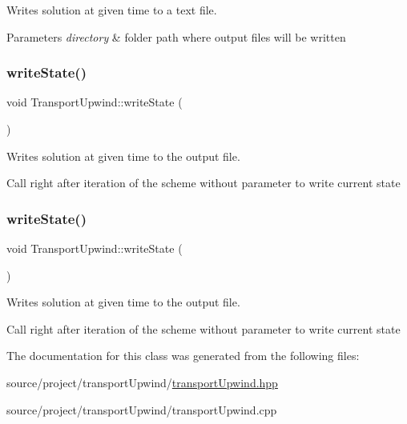 Writes solution at given time to a text file. 


\begin{DoxyParams}{Parameters}
{\em directory} & folder path where output files will be written \\
\hline
\end{DoxyParams}
\mbox{\label{classTransportUpwind_aad7f9cd10acf49402a6a4fe039669a34}} 
\subsubsection{\texorpdfstring{write\+State()}{writeState()}\hspace{0.1cm}{\footnotesize\ttfamily [3/4]}}
{\footnotesize\ttfamily void Transport\+Upwind\+::write\+State (\begin{DoxyParamCaption}{ }\end{DoxyParamCaption})}



Writes solution at given time to the output file. 

Call right after iteration of the scheme without parameter to write current state \mbox{\label{classTransportUpwind_aad7f9cd10acf49402a6a4fe039669a34}} 
\subsubsection{\texorpdfstring{write\+State()}{writeState()}\hspace{0.1cm}{\footnotesize\ttfamily [4/4]}}
{\footnotesize\ttfamily void Transport\+Upwind\+::write\+State (\begin{DoxyParamCaption}{ }\end{DoxyParamCaption})}



Writes solution at given time to the output file. 

Call right after iteration of the scheme without parameter to write current state 

The documentation for this class was generated from the following files\+:\begin{DoxyCompactItemize}
\item 
source/project/transport\+Upwind/\hyperlink{source_2project_2transportUpwind_2transportUpwind_8hpp}{transport\+Upwind.\+hpp}\item 
source/project/transport\+Upwind/transport\+Upwind.\+cpp\end{DoxyCompactItemize}
